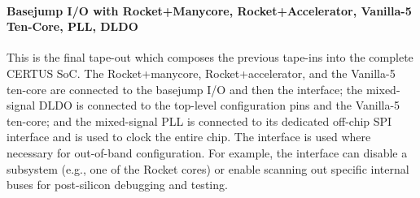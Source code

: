 \paragraph{Basejump I/O with Rocket+Manycore, Rocket+Accelerator,
    Vanilla-5 Ten-Core, PLL, DLDO}
This is the final tape-out which composes the previous tape-ins into the
complete CERTUS SoC. The Rocket+manycore, Rocket+accelerator, and the
Vanilla-5 ten-core are connected to the basejump I/O and then the
 interface; the mixed-signal DLDO is connected to the
top-level configuration pins and the Vanilla-5 ten-core; and the
mixed-signal PLL is connected to its dedicated off-chip SPI interface and
is used to clock the entire chip. The  interface is used
where necessary for out-of-band configuration. For example, the
 interface can disable a subsystem (e.g., one of the Rocket
cores) or enable scanning out specific internal buses for post-silicon
debugging and testing.

